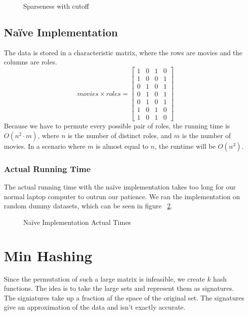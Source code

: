 \documentclass[a4paper,11pt]{article}
\begin{document}
\begin{figure}
    \begin{center}
        
        \caption{Sparseness with cutoff}
        \label{fig:sparsenesscutoff}
    \end{center}
\end{figure}

\subsection{Naïve Implementation}

The data is stored in a characteristic matrix, where the rows are movies and the columns are roles.
\begin{equation}
movies \times roles = 
\begin{bmatrix}
    1 & 0 & 1 & 0\\
    1 & 0 & 0 & 1\\
    0 & 1 & 0 & 1\\
    0 & 1 & 0 & 1\\
    0 & 1 & 0 & 1\\
    1 & 0 & 1 & 0\\
    1 & 0 & 1 & 0
\end{bmatrix}
\end{equation}
Because we have to permute every possible pair of roles, the running time is $O(n^2 \cdot m)$, where $n$ is the number of distinct roles, and $m$ is the number of movies. In a scenario where $m$ is almost equal to $n$, the runtime will be $O(n^3)$. \\

\subsubsection{Actual Running Time}
The actual running time with the naïve implementation takes too long for our normal laptop computer to outrun our patience. We ran the implementation on random dummy datasets, which can be seen in figure ~\ref{fig:naive_at}.

\begin{figure}
    \begin{center}
        
        \caption{Naïve Implementation Actual Times}
        \label{fig:naive_at}
    \end{center}
\end{figure}

\section{Min Hashing}
Since the permutation of such a large matrix is infeasible, we create $k$ hash functions. The idea is to take the large sets and represent them as signatures. The signiatures take up a fraction af the space of the original set. The signatures give an approximation of the data and isn't exactly accurate.\\
\end{document}
